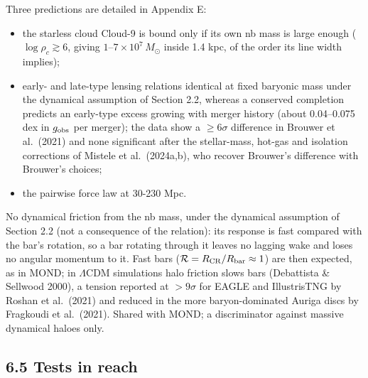 \documentclass[
  10pt,
]{article}
\begin{document}
Three predictions are detailed in Appendix E:
\begin{itemize}
\item the starless cloud Cloud-9 is bound only if its own nb mass is large enough ($\log\rho_c\gtrsim6$, giving $1$--$7\times10^7\,M_\odot$ inside 1.4 kpc, of the order its line width implies);
\item early- and late-type lensing relations identical at fixed baryonic mass under the dynamical assumption of Section 2.2, whereas a conserved completion predicts an early-type excess growing with merger history (about 0.04--0.075 dex in $g_{\rm obs}$ per merger); the data show a $\ge6\sigma$ difference in Brouwer et al.~(2021) and none significant after the stellar-mass, hot-gas and isolation corrections of Mistele et al.~(2024a,b), who recover Brouwer's difference with Brouwer's choices;
\item the pairwise force law at 30-230 Mpc.
\end{itemize}
No dynamical friction from the nb mass, under the dynamical assumption of Section 2.2 (not a consequence of the relation): its response is fast compared with the bar's rotation, so a bar rotating through it leaves no lagging wake and loses no angular momentum to it. Fast bars ($\mathcal{R}=R_{\rm CR}/R_{\rm bar}\approx1$) are then expected, as in MOND; in $\Lambda$CDM simulations halo friction slows bars (Debattista \& Sellwood 2000), a tension reported at $>9\sigma$ for EAGLE and IllustrisTNG by Roshan et al.~(2021) and reduced in the more baryon-dominated Auriga discs by Fragkoudi et al.~(2021). Shared with MOND; a discriminator against massive dynamical haloes only.

\subsection{6.5 Tests in reach}
\end{document}
